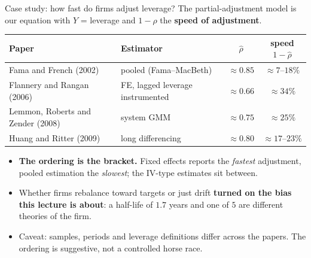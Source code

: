 \documentclass[
  11pt,
  ignorenonframetext,
  aspectratio=169,
]{beamer}
\providecommand{\tightlist}{%
  \setlength{\itemsep}{0pt}\setlength{\parskip}{0pt}}
\begin{document}
\begin{frame}{Case study: how fast do firms adjust leverage?}
\protect{}\label{case-study-how-fast-do-firms-adjust-leverage}
The partial-adjustment model is our equation with \(Y\) = leverage and
\(1-\rho\) the \textbf{speed of adjustment}.

\begin{center}\footnotesize
\begin{tabular}{llcc}
\toprule
Paper & Estimator & $\hat\rho$ & speed $1-\hat\rho$ \\
\midrule
Fama and French (2002) & pooled (Fama--MacBeth) & $\approx 0.85$ & $\approx 7$--$18\%$ \\
Flannery and Rangan (2006) & FE, lagged leverage instrumented & $\approx 0.66$ & $\approx 34\%$ \\
Lemmon, Roberts and Zender (2008) & system GMM & $\approx 0.75$ & $\approx 25\%$ \\
Huang and Ritter (2009) & long differencing & $\approx 0.80$ & $\approx 17$--$23\%$ \\
\bottomrule
\end{tabular}
\end{center}

\begin{itemize}
\tightlist
\item
  \textbf{The ordering is the bracket.} Fixed effects reports the
  \emph{fastest} adjustment, pooled estimation the \emph{slowest}; the
  IV-type estimates sit between.
\item
  Whether firms rebalance toward targets or just drift \textbf{turned on
  the bias this lecture is about}: a half-life of \(1.7\) years and one
  of \(5\) are different theories of the firm.
\item
  Caveat: samples, periods and leverage definitions differ across the
  papers. The ordering is suggestive, not a controlled horse race.
\end{itemize}
\end{frame}
\end{document}
